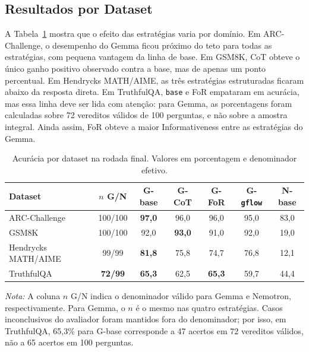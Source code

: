 \documentclass[12pt]{article}
\begin{document}
\FloatBarrier
\subsection{Resultados por Dataset}

A Tabela~\ref{tab:resultado-final-dataset} mostra que o efeito das estratégias varia por domínio. Em ARC-Challenge, o desempenho do Gemma ficou próximo do teto para todas as estratégias, com pequena vantagem da linha de base. Em GSM8K, CoT obteve o único ganho positivo observado contra a base, mas de apenas um ponto percentual. Em Hendrycks MATH/AIME, as três estratégias estruturadas ficaram abaixo da resposta direta. Em TruthfulQA, \texttt{base} e FoR empataram em acurácia, mas essa linha deve ser lida com atenção: para Gemma, as porcentagens foram calculadas sobre 72 vereditos válidos de 100 perguntas, e não sobre a amostra integral. Ainda assim, FoR obteve a maior Informativeness entre as estratégias do Gemma.

\begin{table}[H]
\centering
\scriptsize
\setlength{\tabcolsep}{3pt}
\renewcommand{\arraystretch}{1.15}
\caption{Acurácia por dataset na rodada final. Valores em porcentagem e denominador efetivo.}
\label{tab:resultado-final-dataset}
\begin{tabular}{|p{2.7cm}|c|c|c|c|c|c|}
\hline
\textbf{Dataset} & \textbf{\(n\) G/N} & \textbf{G-base} & \textbf{G-CoT} & \textbf{G-FoR} & \textbf{G-\texttt{gflow}} & \textbf{N-base} \\
\hline
ARC-Challenge & 100/100 & \textbf{97,0} & 96,0 & 96,0 & 95,0 & 83,0 \\
GSM8K & 100/100 & 92,0 & \textbf{93,0} & 91,0 & 92,0 & 19,0 \\
Hendrycks MATH/AIME & 99/99 & \textbf{81,8} & 75,8 & 74,7 & 76,8 & 12,1 \\
TruthfulQA & \textbf{72/99} & \textbf{65,3} & 62,5 & \textbf{65,3} & 59,7 & 44,4 \\
\hline
\end{tabular}
\par\vspace{0.4em}
\begin{minipage}{0.95\textwidth}
\footnotesize\textit{Nota:} A coluna \(n\) G/N indica o denominador válido para Gemma e Nemotron, respectivamente. Para Gemma, o \(n\) é o mesmo nas quatro estratégias. Casos inconclusivos do avaliador foram mantidos fora do denominador; por isso, em TruthfulQA, 65,3\% para G-base corresponde a 47 acertos em 72 vereditos válidos, não a 65 acertos em 100 perguntas.
\end{minipage}
\end{table}
\end{document}
